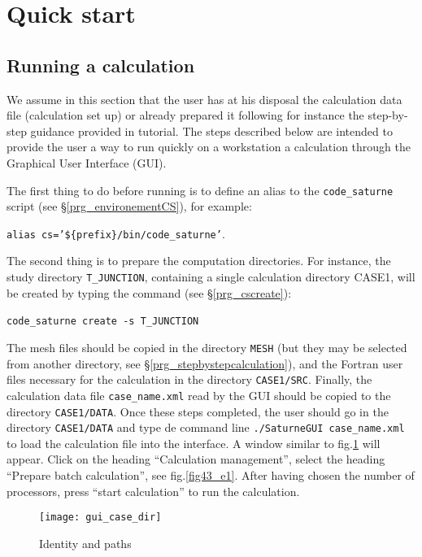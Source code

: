\section{Quick start}
\subsection{Running a calculation}
We assume in this section that the user has at his disposal the calculation data file (calculation set up) or already prepared it following for instance the step-by-step guidance provided in \CS tutorial. The steps described below are intended to provide the user a way to run quickly on a workstation a calculation through the Graphical User Interface (GUI).

The first thing to do before running \CS is to define an alias to the \texttt{code\_saturne} script 
(see \S\ref{prg_environementCS}), for example:
\begin{center}
\texttt{alias cs='\$\{prefix\}/bin/code\_saturne'}.
\end{center}
The second thing is to prepare the computation directories. For instance, the study directory \texttt{T\_JUNCTION}, containing a single calculation directory CASE1, will be created by typing the command (see \S\ref{prg_cscreate}):\
\begin{center}
\texttt{code\_saturne create -s T\_JUNCTION}\
\end{center}
The mesh files should be copied in the directory \texttt{MESH} (but they may be selected from another directory, see \S\ref{prg_stepbystepcalculation}), and the Fortran user files necessary for the calculation in the directory \texttt{CASE1/SRC}.  Finally, the calculation data file \texttt{case\_name.xml} read by the GUI should be copied to the directory \texttt{CASE1/DATA}.
Once these steps completed, the user should go in the directory \texttt{CASE1/DATA} and type de command line \texttt{./SaturneGUI case\_name.xml} to load the calculation file into the interface. A window similar to fig.\ref{fig3_e1} will appear. Click on the heading ``Calculation management'', select the heading ``Prepare batch calculation'', see fig.\ref{fig43_e1}. After having chosen the number of processors, press ``start calculation'' to run the calculation.

\begin{figure}[!ht]
\begin{center}
\texttt{[image: gui\_case\_dir]}
\caption{Identity and paths}
\label{fig3_e1}
\end{center}
\end{figure}

